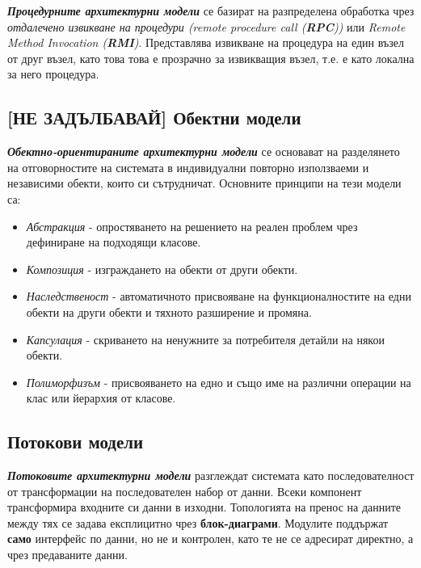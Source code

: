 \documentclass{scrartcl}
\begin{document}
\begin{FlushLeft}
\textbf{\textit{Процедурните архитектурни модели}} се базират на разпределена обработка чрез \textit{отдалечено извикване на процедури (remote procedure call (\textbf{RPC}))} или \textit{Remote Method Invocation (\textbf{RMI})}.
Представлява извикване на процедура на един възел от друг възел, като това това е прозрачно за извикващия възел, т.е. е като локална за него процедура.

\subsection{[НЕ ЗАДЪЛБАВАЙ] Обектни модели}

\textbf{\textit{Обектно-ориентираните архитектурни модели}} се основават на разделянето на отговорностите на системата в индивидуални повторно използваеми и независими обекти, които си сътрудничат.
Основните принципи на тези модели са:
\begin{itemize}
    \item \textit{Абстракция} - опростяването на решението на реален проблем чрез дефиниране на подходящи класове.
    \item \textit{Композиция} - изграждането на обекти от други обекти.
    \item \textit{Наследственост} - автоматичното присвояване на функционалностите на едни обекти на други обекти и тяхното разширение и промяна.
    \item \textit{Капсулация} - скриването на ненужните за потребителя детайли на някои обекти.
    \item \textit{Полиморфизъм} - присвояването на едно и също име на различни операции на клас или йерархия от класове.
\end{itemize}

\subsection{Потокови модели}

\textbf{\textit{Потоковите архитектурни модели}} разглеждат системата като последователност от трансформации на последователен набор от данни.
Всеки компонент трансформира входните си данни в изходни.
Топологията на пренос на данните между тях се задава експлицитно чрез \textbf{блок-диаграми}.
Модулите поддържат \textbf{само} интерфейс по данни, но не и контролен, като те не се адресират директно, а чрез предаваните данни.


\end{FlushLeft}
\end{document}
